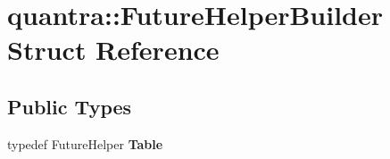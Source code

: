 \hypertarget{structquantra_1_1FutureHelperBuilder}{}\section{quantra\+:\+:Future\+Helper\+Builder Struct Reference}
\label{structquantra_1_1FutureHelperBuilder}
\subsection*{Public Types}
\begin{DoxyCompactItemize}
\item 
\mbox{\label{structquantra_1_1FutureHelperBuilder_a846a6dd0fc4a99921e7445f22abfcd30}} 
typedef Future\+Helper {\bfseries Table}
\end{DoxyCompactItemize}
